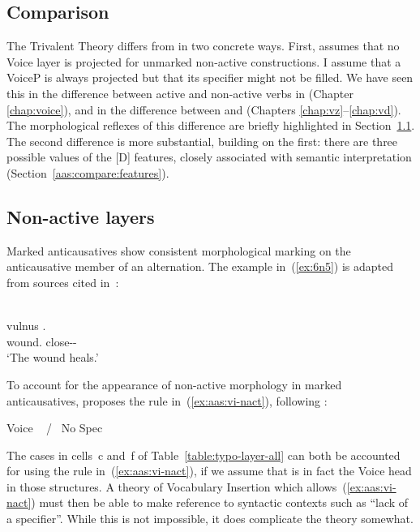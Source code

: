 \begin{exe}
\begin{xlist}
\begin{exe}
\begin{exe}
\begin{xlist}
\begin{exe}
\section{Comparison} \label{aas:compare}
The Trivalent Theory differs from  in two concrete ways. First,  assumes that no Voice layer is projected for unmarked non-active constructions. I assume that a VoiceP is always projected but that its specifier might not be filled. We have seen this in the difference between active and non-active verbs in {\tkal} (Chapter \ref{chap:voice}), and in the difference between {\vz} and {\vd} (Chapters \ref{chap:vz}--\ref{chap:vd}). The morphological reflexes of this difference are briefly highlighted in Section~\ref{aas:compare:vi-nact}. The second difference  is more substantial, building on the first: there are three possible values of the [D] features, closely associated with semantic interpretation (Section~\ref{aas:compare:features}).

	\subsection{Non-active layers} \label{aas:compare:vi-nact}
Marked anticausatives show consistent morphological marking on the anticausative member of an alternation. The  example in~(\ref{ex:6n5}) is adapted from sources cited in~\cite{kastnerzu17}:
 \begin{exe}
\ex   {}\label{ex:6n5}\\
  \gll vulnus .\\
 	  wound. close--\\
 	\glt `The wound heals.' 
	
 \z 

To account for the appearance of non-active morphology in marked anticausatives,  proposes the rule in~(\ref{ex:aas:vi-nact}), following \cite{embick04}:
 \begin{exe}
\ex \label{ex:aas:vi-nact}Voice \lra~ / \trace~No Spec 
 \z 

The cases in cells~c and~f of Table~\ref{table:typo-layer-all} can both be accounted for using the rule in~(\ref{ex:aas:vi-nact}), if we assume that {\vz} is in fact the Voice head in those structures. A theory of Vocabulary Insertion which allows~(\ref{ex:aas:vi-nact}) must then be able to make reference to syntactic contexts such as ``lack of a specifier''. While this is not impossible, it does complicate the theory somewhat.\label{r1:6:1}


\end{exe}
\end{exe}
\end{exe}
\end{xlist}
\end{exe}
\end{exe}
\end{xlist}
\end{exe}
